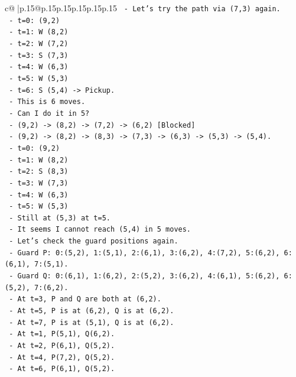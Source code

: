 \documentclass{article}
\begin{document}
{\begin{supertabular}{c@{$\;$}|p{.15\linewidth}@{}p{.15\linewidth}p{.15\linewidth}p{.15\linewidth}p{.15\linewidth}p{.15\linewidth}}
{{{\texttt{  {-} Let's try the path via (7,3) again.} \\
\texttt{    {-} t=0: (9,2)} \\
\texttt{    {-} t=1: W (8,2)} \\
\texttt{    {-} t=2: W (7,2)} \\
\texttt{    {-} t=3: S (7,3)} \\
\texttt{    {-} t=4: W (6,3)} \\
\texttt{    {-} t=5: W (5,3)} \\
\texttt{    {-} t=6: S (5,4) {-}> Pickup.} \\
\texttt{    {-} This is 6 moves.} \\
\texttt{  {-} Can I do it in 5?} \\
\texttt{    {-} (9,2) {-}> (8,2) {-}> (7,2) {-}> (6,2) {[}Blocked{]}} \\
\texttt{    {-} (9,2) {-}> (8,2) {-}> (8,3) {-}> (7,3) {-}> (6,3) {-}> (5,3) {-}> (5,4).} \\
\texttt{    {-} t=0: (9,2)} \\
\texttt{    {-} t=1: W (8,2)} \\
\texttt{    {-} t=2: S (8,3)} \\
\texttt{    {-} t=3: W (7,3)} \\
\texttt{    {-} t=4: W (6,3)} \\
\texttt{    {-} t=5: W (5,3)} \\
\texttt{    {-} Still at (5,3) at t=5.} \\
\texttt{  {-} It seems I cannot reach (5,4) in 5 moves.} \\
\texttt{  {-} Let's check the guard positions again.} \\
\texttt{  {-} Guard P: 0:(5,2), 1:(5,1), 2:(6,1), 3:(6,2), 4:(7,2), 5:(6,2), 6:(6,1), 7:(5,1).} \\
\texttt{  {-} Guard Q: 0:(6,1), 1:(6,2), 2:(5,2), 3:(6,2), 4:(6,1), 5:(6,2), 6:(5,2), 7:(6,2).} \\
\texttt{  {-} At t=3, P and Q are both at (6,2).} \\
\texttt{  {-} At t=5, P is at (6,2), Q is at (6,2).} \\
\texttt{  {-} At t=7, P is at (5,1), Q is at (6,2).} \\
\texttt{  {-} At t=1, P(5,1), Q(6,2).} \\
\texttt{  {-} At t=2, P(6,1), Q(5,2).} \\
\texttt{  {-} At t=4, P(7,2), Q(5,2).} \\
\texttt{  {-} At t=6, P(6,1), Q(5,2).} \\
}}}
\end{supertabular}}
\end{document}
